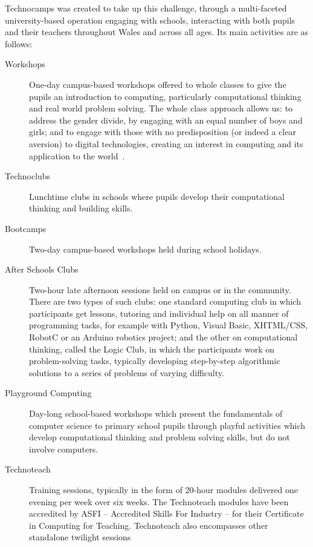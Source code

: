 \documentclass{sig-alternate}
\begin{document}
Technocamps was created to take up this challenge, through a
multi-faceted university-based operation engaging with schools,
interacting with both pupils and their teachers throughout Wales and
across all ages. Its main activities are as follows:

\begin{description}
\item[Workshops]
One-day campus-based workshops offered to whole classes
to give the pupils an introduction to computing,
particularly computational thinking and real world problem solving.
The whole class approach allows us: to address the gender divide,
by engaging with an equal number of boys and girls;
and to engage with those with no predisposition (or indeed a clear aversion)
to digital technologies, creating an interest in computing and its
application to the world~\cite{ball-et-al:2012}.
\item[Technoclubs\footnotemark]
Lunchtime clubs in schools where pupils develop
their computational thinking and building skills.
\item[Bootcamps]
Two-day campus-based workshops held during school holidays.
\item[After Schools Clubs]
Two-hour late afternoon sessions held on campus or in the community.
There are two types of such clubs: one standard computing club
in which participants get lessons, tutoring and individual help
on all manner of programming tasks, for example with Python, Visual
Basic, XHTML/CSS,  RobotC or an Arduino robotics project;
and the other on computational thinking, called the Logic Club,
in which the participants work on problem-solving tasks,
typically developing step-by-step algorithmic solutions
to a series of problems of varying difficulty.
\item[Playground Computing\footnotemark]
Day-long school-based workshops which present
the fundamentals of computer science to primary school pupils
through playful activities which develop computational thinking
and problem solving skills, but do not involve computers.
\item[Technoteach\footnotemark]
Training sessions, typically in the form of 20-hour modules
delivered one evening per week over six weeks.
The Technoteach modules have been accredited by ASFI
-- Accredited Skills For Industry --
for their Certificate in Computing for Teaching.
Technoteach also encompasses other standalone twilight sessions

\end{description}
\end{document}
